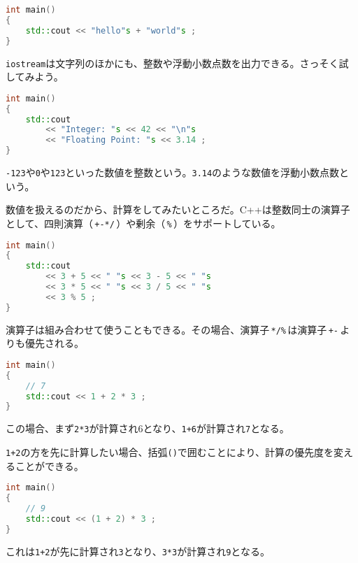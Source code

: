 \begin{lstlisting}[language={C++}]
int main()
{
    std::cout << "hello"s + "world"s ;
}
\end{lstlisting}


\texttt{iostream}は文字列のほかにも、整数や浮動小数点数を出力できる。さっそく試してみよう。

\begin{lstlisting}[language={C++}]
int main()
{
    std::cout
        << "Integer: "s << 42 << "\n"s
        << "Floating Point: "s << 3.14 ;
}
\end{lstlisting}

\texttt{-123}や\texttt{0}や\texttt{123}といった数値を整数という。\texttt{3.14}のような数値を浮動小数点数という。

数値を扱えるのだから、計算をしてみたいところだ。C++は整数同士の演算子として、四則演算（\,\texttt{+-*/}\,）や剰余（\,\texttt{\%}\,）をサポートしている。

\begin{lstlisting}[language={C++}]
int main()
{
    std::cout
        << 3 + 5 << " "s << 3 - 5 << " "s
        << 3 * 5 << " "s << 3 / 5 << " "s
        << 3 % 5 ;
}
\end{lstlisting}

演算子は組み合わせて使うこともできる。その場合、演算子\,\texttt{*/\%}\,は演算子\,\texttt{+-}\,よりも優先される。

\begin{lstlisting}[language={C++}]
int main()
{
    // 7
    std::cout << 1 + 2 * 3 ;
}
\end{lstlisting}

この場合、まず\texttt{2*3}が計算され6となり、\texttt{1+6}が計算され\texttt{7}となる。

\texttt{1+2}の方を先に計算したい場合、括弧\texttt{()}で囲むことにより、計算の優先度を変えることができる。

\begin{lstlisting}[language={C++}]
int main()
{
    // 9
    std::cout << (1 + 2) * 3 ;
}
\end{lstlisting}

これは\texttt{1+2}が先に計算され\texttt{3}となり、\texttt{3*3}が計算され\texttt{9}となる。

